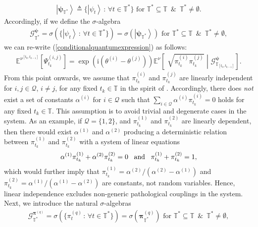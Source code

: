 \documentclass[12pt,a4paper]{article}
\def\T{\mathbb{T}}
\def\G{\mathscr{G}}
\begin{document}
\begin{align}
\left|\boldsymbol{\psi}_{\T^*}\right\rangle \triangleq \{ \left|\psi_{t}\right\rangle \, : \, \forall t\in\T^* \} \,\, \text{for $\T^*\subseteq\T$} \,\,\,\text{\&}\,\,\, \T^* \neq \emptyset. 
\end{align}
Accordingly, if we define the $\sigma$-algebra
\begin{align}
\G^{\boldsymbol{\psi}}_{\T^*} = \sigma\left( \{\left|\psi_{t}\right\rangle \, : \, \forall t\in\T^*\} \right) = \sigma\left( \left|\boldsymbol{\psi}_{\T^*}\right\rangle \right) \,\, \text{for $\T^*\subseteq\T$}  \,\,\,\text{\&}\,\,\, \T^* \neq \emptyset, 
\end{align}
we can re-write (\ref{conditionalquantumexpression}) as follows:
\begin{align}
\mathbb{E}^{\nu^{[t_{0},t_{k-1}]}}\left[\Psi_{t_{k}}^{(i,j)}\right] = \exp\left( \text{i}\left( \theta^{(i)} - \theta^{(j)} \right) \right)\mathbb{E}^{\nu}\left[ \,\,  \sqrt{\pi_{t_{k}}^{(i)}\pi_{t_{k}}^{(j)}} \,\, \left| \,\, \G^{\boldsymbol{\psi}}_{\T_{[t_0,t_{k-1}]}} \right.\right]. 
\end{align}
From this point onwards, we assume that $\pi_{t_{k}}^{(i)}$ and $\pi_{t_{k}}^{(j)}$ are linearly independent for $i,j\in\mathcal{Q}$, $i\neq j$, for any fixed $t_k\in\T$ in the spirit of \cite{Brody Hughston 2025}. Accordingly, there does \emph{not} exist a set of constants $\alpha^{(i)}$ for $i\in\mathcal{Q}$ such that $\sum_{i\in\mathcal{Q}}\alpha^{(i)}\pi_{t_{k}}^{(i)} = 0$ holds for any fixed $t_k\in\T$. This assumption is to avoid trivial and degenerate cases in the system. As an example, if $\mathcal{Q}=\{1,2\}$, and $\pi_{t_{k}}^{(1)}$ and $\pi_{t_{k}}^{(2)}$ are linearly dependent, then there would exist $\alpha^{(1)}$ and $\alpha^{(2)}$ producing a deterministic relation between $\pi_{t_{k}}^{(1)}$ and $\pi_{t_{k}}^{(2)}$ with a system of linear equations
\begin{align}
\alpha^{(1)}\pi_{t_{k}}^{(1)} + \alpha^{(2)}\pi_{t_{k}}^{(2)} =0 \,\,\,\,\, \text{and} \,\,\,\,\, \pi_{t_{k}}^{(1)} + \pi_{t_{k}}^{(2)} = 1, \notag
\end{align}
which would further imply that $\pi_{t_{k}}^{(1)} = \alpha^{(2)}/(\alpha^{(2)} - \alpha^{(1)})$ and $\pi_{t_{k}}^{(2)} = \alpha^{(1)}/(\alpha^{(1)} - \alpha^{(2)})$ are constants, not random variables. Hence, linear independence excludes non-generic pathological couplings in the system. Next, we introduce the natural $\sigma$-algebras
\begin{align}
\G^{\boldsymbol{\pi}^{(q)}}_{\T^*} = \sigma\left( \{\pi_{t}^{(q)} \, : \, \forall t\in\T^*\} \right) = \sigma\left( \boldsymbol{\pi}_{\T^*}^{(q)} \right) \,\, \text{for $\T^*\subseteq\T$} \,\,\,\text{\&}\,\,\, \T^* \neq \emptyset, 
\end{align}
\end{document}
